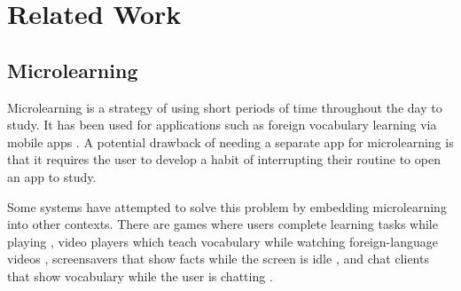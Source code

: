 \documentclass{sigchi}
\begin{document}


\section{Related Work}

\subsection{Microlearning}

Microlearning is a strategy of using short periods of time throughout the day to study. It has been used for applications such as foreign vocabulary learning via mobile apps \cite{microlearning} \cite{micromandarin}. A potential drawback of needing a separate app for microlearning is that it requires the user to develop a habit of interrupting their routine to open an app to study. %

Some systems have attempted to solve this problem by embedding microlearning into other contexts. There are games where users complete learning tasks while playing \cite{carriearcade}, video players which teach vocabulary while watching foreign-language videos \cite{smartsubtitles}, screensavers that show facts while the screen is idle \cite{screensaver}, and chat clients that show vocabulary while the user is chatting \cite{cai2015wait}.
\end{document}
